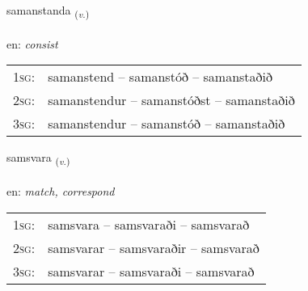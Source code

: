 \documentclass[frontgrid, backgrid]{flacards}\usepackage[]{graphicx}\usepackage[]{xcolor}
\begin{document}
\renewcommand{\blhead}{\vskip5pt {\small\bfseries\footnotesize Sagnorð | Verb }}
\renewcommand{\bcfoot}{\vskip5pt \hspace{2pt}{\small\bfseries\footnotesize 3K}}


{samanstanda \small{\textsubscript{(\textit{v.})}} \\[1ex] %
\textphonetic{[saːmanstanta]} \\
en: \emph{consist} \\  [2ex]
\renewcommand*{\arraystretch}{0.8}
\begin{tabular}{p{1cm}l}
\textsc{1sg}: & samanstend -- samanstóð -- samanstaðið \\ 
\textsc{2sg}: & samanstendur -- samanstóðst -- samanstaðið \\ 
\textsc{3sg}: & samanstendur -- samanstóð -- samanstaðið \\ 
\end{tabular}
}

\renewcommand{\flhead}{\vskip5pt \fboxsep=0pt {\small\bfseries\footnotesize Sagnorð | Verb}}
\renewcommand{\fcfoot}{\vskip5pt \fboxsep=0pt \hspace{2pt}{\small\bfseries\footnotesize 3K}}

\renewcommand{\blhead}{\vskip5pt {\small\bfseries\footnotesize Sagnorð | Verb }}
\renewcommand{\bcfoot}{\vskip5pt \hspace{2pt}{\small\bfseries\footnotesize 3K}}


{samsvara \small{\textsubscript{(\textit{v.})}} \\[1ex] %
\textphonetic{[samsvara]} \\
en: \emph{match, correspond} \\  [2ex]
\renewcommand*{\arraystretch}{0.8}
\begin{tabular}{p{1cm}l}
\textsc{1sg}: & samsvara -- samsvaraði -- samsvarað \\ 
\textsc{2sg}: & samsvarar -- samsvaraðir -- samsvarað \\ 
\textsc{3sg}: & samsvarar -- samsvaraði -- samsvarað \\ 
\end{tabular}
}
\end{document}
